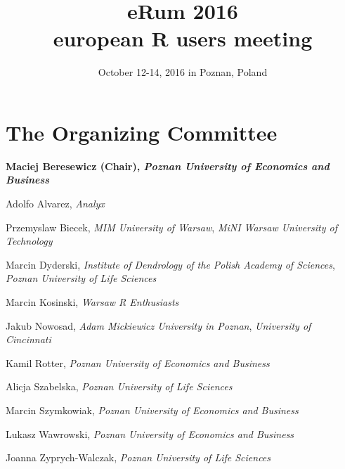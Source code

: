 \documentclass[11pt,oneside]{book}
\title{eRum 2016 \\ european R users meeting}
\author{October 12-14, 2016 in Poznan, Poland}
\date{}
\begin{document}


\frontmatter
\maketitle

\chapter{The Organizing Committee}

\textbf{Maciej Beresewicz (Chair), \textit{Poznan University of Economics and Business}}

Adolfo Alvarez, \textit{Analyx}

Przemyslaw Biecek, \textit{MIM University of Warsaw}, \textit{MiNI Warsaw University of Technology}

Marcin Dyderski, \textit{Institute of Dendrology of the Polish Academy of Sciences}, \textit{Poznan University of Life Sciences}

Marcin Kosinski, \textit{Warsaw R Enthusiasts}

Jakub Nowosad, \textit{Adam Mickiewicz University in Poznan}, \textit{University of Cincinnati}

Kamil Rotter, \textit{Poznan University of Economics and Business}

Alicja Szabelska, \textit{Poznan University of Life Sciences}

Marcin Szymkowiak, \textit{Poznan University of Economics and Business}

Lukasz Wawrowski, \textit{Poznan University of Economics and Business}

Joanna Zyprych-Walczak, \textit{Poznan University of Life Sciences}
\end{document}
